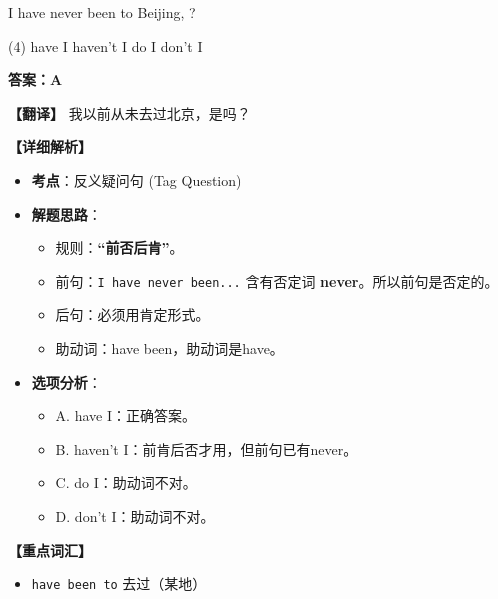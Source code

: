 \documentclass[11pt, a4paper]{article}
\newcommand{\analysis}[4]{
    \begin{solutionbox}
        \textbf{答案：#1}
        
        \textbf{【翻译】} #2
        
        \textbf{【详细解析】}
        #3
        
        \textbf{【重点词汇】}
        #4
    \end{solutionbox}
}
\newcommand{\blank}{\underline{\hspace{1.5cm}}}
\begin{document}
\begin{questions}
    \item I have never been to Beijing, \blank?
    \begin{tasks}(4)
        \task have I \task haven't I \task do I \task don't I
    \end{tasks}
    \analysis{A}{我以前从未去过北京，是吗？}{
        \begin{itemize}
            \item \textbf{考点}：反义疑问句 (Tag Question)
            \item \textbf{解题思路}：
                \begin{itemize}
                    \item 规则：\textbf{“前否后肯”}。
                    \item 前句：\texttt{I have never been...} 含有否定词 \textbf{never}。所以前句是否定的。
                    \item 后句：必须用肯定形式。
                    \item 助动词：have been，助动词是have。
                \end{itemize}
            \item \textbf{选项分析}：
                \begin{itemize}
                    \item A. have I：正确答案。
                    \item B. haven't I：前肯后否才用，但前句已有never。
                    \item C. do I：助动词不对。
                    \item D. don't I：助动词不对。
                \end{itemize}
        \end{itemize}
    }{
        \begin{itemize}
            \item \texttt{have been to} 去过（某地）
        \end{itemize}
    }


\end{questions}
\end{document}
